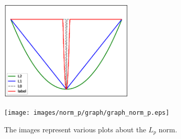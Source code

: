 \begin{figure}[t]
\vspace{-15pt}
	\begin{minipage}[b]{0.5\hsize}
		\centering
		\includegraphics[width=64mm, height = 48mm]{images/norm_p/graph/graph_norm.eps}
		 \label{fig:nom_p/comparison}
	\end{minipage}
	\begin{minipage}[b]{0.5\hsize}
		\centering
		\texttt{[image: images/norm\_p/graph/graph\_norm\_p.eps]}
		 \label{fig:nom_p/graph_norm_p}
	\end{minipage}
	\caption{The images represent various plots about the $L_{p}$ norm.}
	\label{fig:graph_lp}
\end{figure}
